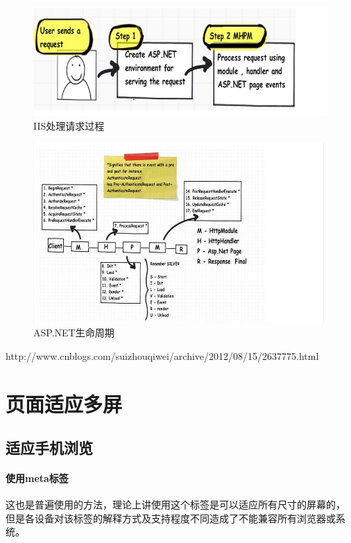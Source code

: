 \documentclass{book}
\begin{document}
\begin{figure}[htbp]
	\centering
	\includegraphics[scale=0.8]{IISHandleUserRequest.png}
	\caption{IIS处理请求过程}
	\label{fig:IISHandleUserRequest}
\end{figure}

\begin{figure}[htbp]
	\centering
	\includegraphics[scale=0.8]{TheWholeLifeCycleOfHttp.png}
	\caption{ASP.NET生命周期}
	\label{fig:TheWholeLifeCycleOfHttp}
\end{figure}
http://www.cnblogs.com/suizhouqiwei/archive/2012/08/15/2637775.html
\section{页面适应多屏}

\subsection{适应手机浏览}
\paragraph{使用meta标签}这也是普遍使用的方法，理论上讲使用这个标签是可以适应所有尺寸的屏幕的，
但是各设备对该标签的解释方式及支持程度不同造成了不能兼容所有浏览器或系统。
\end{document}
